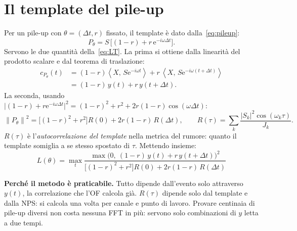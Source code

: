 \documentclass[11pt,a4paper]{article}
\newcommand{\scal}[2]{\left\langle #1,\, #2 \right\rangle}
\newcommand{\norm}[1]{\left\lVert #1 \right\rVert}
\newcommand{\e}{\mathrm{e}}
\newcommand{\dt}{\Delta t}
\begin{document}
\section{Il template del pile-up}
Per un pile-up con $\theta=(\dt,r)$ fissato, il template è dato dalla~\eqref{eq:pileup}:
\begin{equation}
  P_\theta = S\,\Big[(1-r) + r\,\e^{-i\omega\dt}\Big].
\end{equation}
Servono le due quantità della~\eqref{eq:LT}. La prima si ottiene dalla linearità del prodotto
scalare e dal teorema di traslazione:
\begin{align}
  c_{P_\theta}(t)
  &= (1-r)\scal{X}{S\e^{-i\omega t}} + r\,\scal{X}{S\e^{-i\omega(t+\dt)}} \nonumber\\
  &= (1-r)\, y(t) + r\, y(t+\dt).
  \label{eq:cP}
\end{align}
La seconda, usando $\big|(1-r)+r\e^{-i\omega\dt}\big|^2 = (1-r)^2 + r^2 + 2r(1-r)\cos(\omega\dt)$:
\begin{equation}
  \norm{P_\theta}^2 = \big[(1-r)^2 + r^2\big] R(0) + 2r(1-r)\, R(\dt),
  \qquad
  R(\tau) = \sum_k \frac{|S_k|^2 \cos(\omega_k\tau)}{J_k}.
  \label{eq:normP}
\end{equation}
$R(\tau)$ è l'\emph{autocorrelazione del template} nella metrica del rumore: quanto il template
somiglia a se stesso spostato di $\tau$. Mettendo insieme:
\begin{equation}
  \boxed{\;L(\theta) = \max_t \frac{\max\!\big(0,\ (1-r)\,y(t) + r\,y(t+\dt)\big)^2}
  {\big[(1-r)^2 + r^2\big] R(0) + 2r(1-r)\, R(\dt)}\;}
  \label{eq:Ltheta}
\end{equation}

\begin{idea}
\textbf{Perché il metodo è praticabile.} Tutto dipende dall'evento solo attraverso $y(t)$, la
correlazione che l'OF calcola già. $R(\tau)$ dipende solo dal template e dalla NPS: si calcola una
volta per canale e punto di lavoro. Provare centinaia di pile-up diversi non costa nessuna FFT in
più: servono solo combinazioni di $y$ letta a due tempi.
\end{idea}
\end{document}
